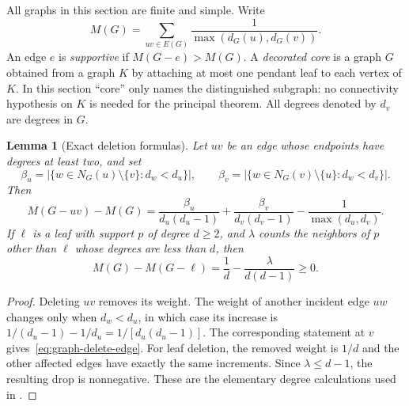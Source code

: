\documentclass[11pt,a4paper]{article}
\newtheorem{lemma}[theorem]{Lemma}
\theoremstyle{definition}\newtheorem{definition}[theorem]{Definition}
\theoremstyle{remark}\newtheorem{remark}[theorem]{Remark}
\begin{document}
All graphs in this section are finite and simple. Write
\[
 M(G)=\sum_{uv\in E(G)}\frac{1}{\max(d_G(u),d_G(v))}.
\]
An edge $e$ is \emph{supportive} if $M(G-e)>M(G)$. A
\emph{decorated core} is a graph $G$ obtained from a graph $K$ by attaching
at most one pendant leaf to each vertex of $K$. In this section ``core''
only names the distinguished subgraph: no connectivity hypothesis on
$K$ is needed for the principal theorem. All degrees denoted by $d_v$
are degrees in $G$.

\begin{lemma}[Exact deletion formulas]
\label{lem:graph-exact-deletion}
Let $uv$ be an edge whose endpoints have degrees at least two, and set
\[
 \beta_u=|\{w\in N_G(u)\setminus\{v\}:d_w<d_u\}|,
 \qquad
 \beta_v=|\{w\in N_G(v)\setminus\{u\}:d_w<d_v\}|.
\]
Then
\begin{equation}\label{eq:graph-delete-edge}
 M(G-uv)-M(G)=
 \frac{\beta_u}{d_u(d_u-1)}+
 \frac{\beta_v}{d_v(d_v-1)}-
 \frac1{\max(d_u,d_v)}.
\end{equation}
If $\ell$ is a leaf with support $p$ of degree $d\ge2$, and
$\lambda$ counts the neighbors of $p$ other than $\ell$ whose degrees
are less than $d$, then
\begin{equation}\label{eq:graph-delete-leaf}
 M(G)-M(G-\ell)=\frac1d-\frac{\lambda}{d(d-1)}\ge0.
\end{equation}
\end{lemma}
\begin{proof}
Deleting $uv$ removes its weight. The weight of another incident edge
$uw$ changes only when $d_w<d_u$, in which case its increase is
$1/(d_u-1)-1/d_u=1/[d_u(d_u-1)]$. The corresponding statement at $v$
gives~\eqref{eq:graph-delete-edge}. For leaf deletion, the removed
weight is $1/d$ and the other affected edges have exactly the same
increments. Since $\lambda\le d-1$, the resulting drop is nonnegative.
These are the elementary degree calculations used in
\cite{Corpus087,Corpus094}.
\end{proof}
\end{document}
